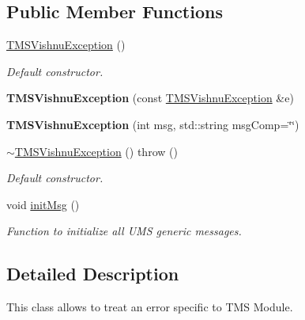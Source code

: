 \subsection*{Public Member Functions}
\begin{DoxyCompactItemize}
\item 
\hyperlink{classTMSVishnuException_afc045386530c82cbd14d7499bb346209}{TMSVishnuException} ()
\begin{DoxyCompactList}\small\item\em Default constructor. \item\end{DoxyCompactList}\item 
\hypertarget{classTMSVishnuException_a34e34f5815a8f12c5a42d07260f6f012}{
{\bfseries TMSVishnuException} (const \hyperlink{classTMSVishnuException}{TMSVishnuException} \&e)}
\label{classTMSVishnuException_a34e34f5815a8f12c5a42d07260f6f012}

\item 
\hypertarget{classTMSVishnuException_a28396b88bf65fc54fb2eae5a30b3ad8a}{
{\bfseries TMSVishnuException} (int msg, std::string msgComp=\char`\"{}\char`\"{})}
\label{classTMSVishnuException_a28396b88bf65fc54fb2eae5a30b3ad8a}

\item 
\hypertarget{classTMSVishnuException_a2357555574bd5b081413b8ceea83e627}{
\hyperlink{classTMSVishnuException_a2357555574bd5b081413b8ceea83e627}{$\sim$TMSVishnuException} ()  throw ()}
\label{classTMSVishnuException_a2357555574bd5b081413b8ceea83e627}

\begin{DoxyCompactList}\small\item\em Default constructor. \item\end{DoxyCompactList}\item 
\hypertarget{classTMSVishnuException_acc49ac2fbad4757cefca21a16c1bb658}{
void \hyperlink{classTMSVishnuException_acc49ac2fbad4757cefca21a16c1bb658}{initMsg} ()}
\label{classTMSVishnuException_acc49ac2fbad4757cefca21a16c1bb658}

\begin{DoxyCompactList}\small\item\em Function to initialize all UMS generic messages. \item\end{DoxyCompactList}\end{DoxyCompactItemize}


\subsection{Detailed Description}
This class allows to treat an error specific to TMS Module. 

